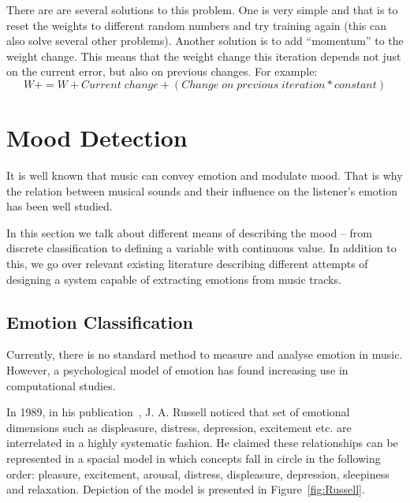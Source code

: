 There are are several solutions to this problem. One is very simple and that is to reset the weights to different random numbers and try training again (this can also solve several other problems). Another solution is to add ``momentum'' to the weight change. This means that the weight change this iteration depends not just on the current error, but also on previous changes. For example: 
\begin{equation}
W+ = W + Current\; change + (Change\; on \;previous\; iteration * constant)
\end{equation}

\vspace{20pt}


\section{Mood Detection}
\vspace{10pt}

It is well known that music can convey emotion and modulate mood. That is why the relation between musical sounds and their influence on the listener’s emotion has been well studied.

In this section we talk about different means of describing the mood -- from discrete classification to defining a variable with continuous value. In addition to this, we go over relevant existing literature describing different attempts of designing a system capable of extracting emotions from music tracks.

\subsection{Emotion Classification}
\label{sec:emotionClass}

Currently, there is no standard method to measure and analyse emotion in music. However, a psychological model of emotion has found increasing use in computational studies. 

In 1989, in his publication~\cite{Russell}, J. A. Russell noticed that set of emotional dimensions such as displeasure, distress, depression, excitement etc. are interrelated in a highly systematic fashion. He claimed these relationships can be represented in a spacial model in which concepts fall in circle in the following order: pleasure, excitement, arousal, distress, displeasure, depression, sleepiness and relaxation. Depiction of the model is presented in Figure~\ref{fig:Russell}.

